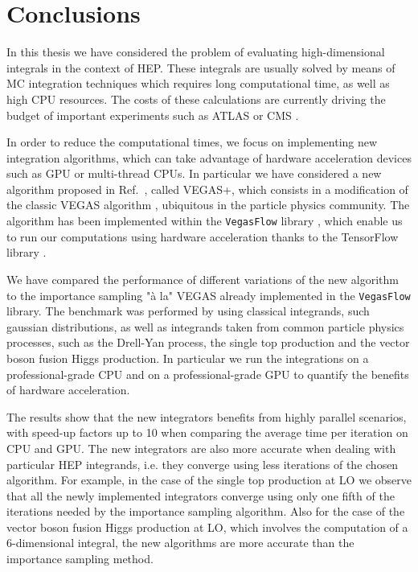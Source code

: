 \documentclass[../main/main.tex]{subfiles}
\begin{document}
\chapter{Conclusions}

In this thesis we have considered the problem of evaluating high-dimensional integrals in the context of HEP.
These integrals are usually solved by means of MC integration techniques which requires long computational time, as well as high CPU resources.
The costs of these calculations are currently driving the budget of important experiments such as ATLAS or CMS \cite{Buckley:2019wov}.

In order to reduce the computational times, we focus on implementing new integration algorithms, which can take advantage of hardware acceleration devices such as GPU or multi-thread CPUs.
In particular we have considered a new algorithm proposed in Ref.~\cite{Lepage:2020tgj}, called VEGAS+,  which consists in a modification of the classic VEGAS algorithm \cite{Lepage:1977sw}, ubiquitous in the particle physics community.
The algorithm has been implemented within the \texttt{VegasFlow} library \cite{Carrazza:2020rdn}, which enable us to run our computations using hardware acceleration thanks to the TensorFlow library
\cite{tensorflow2015-whitepaper}. 

We have compared the performance of different variations of the new algorithm to the importance sampling "à la" VEGAS already implemented in the \texttt{VegasFlow} library. The benchmark was performed by using classical integrands, such gaussian distributions, as well as integrands taken from common particle physics processes, such as the Drell-Yan process, the single top production and the vector boson fusion Higgs production. In particular we run the integrations on a professional-grade CPU and on a professional-grade GPU to quantify the benefits of hardware acceleration.

The results show that the new integrators benefits from highly parallel scenarios, with speed-up factors up to 10 when comparing the average time per iteration on CPU and GPU. The new integrators are also more accurate when dealing with particular HEP integrands, i.e. they converge using less iterations of the chosen algorithm. For example, 
in the case of the single top production at LO we observe that all the newly implemented integrators converge using only one fifth of the iterations needed by the importance sampling algorithm. Also for the case of the vector boson fusion Higgs production at LO, which involves the computation of a 6-dimensional integral, the new algorithms are more accurate than the importance sampling method.
\end{document}
